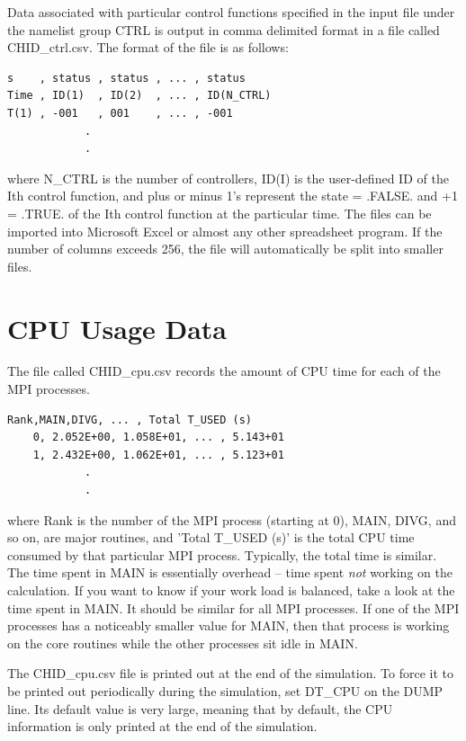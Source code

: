 \documentclass[11pt]{book}
\begin{document}
Data associated with particular control functions specified in the input file under the namelist group {\ct CTRL} is output in comma delimited format in a file called {\ct CHID\_ctrl.csv}. The format of the file is as follows:
\begin{lstlisting}
s    , status , status , ... , status
Time , ID(1)  , ID(2)  , ... , ID(N_CTRL)
T(1) , -001   , 001    , ... , -001
            .
            .
\end{lstlisting}
where {\ct N\_CTRL} is the number of controllers, {\ct ID(I)} is the user-defined ID of the {\ct I}th control function, and plus or minus 1's represent the state { = .FALSE. and +1 = .TRUE.} of the {\ct I}th control function at the particular time. The files can be imported into Microsoft Excel or almost any other spreadsheet program. If the number of columns exceeds 256, the file will automatically be split into smaller files.

\section{CPU Usage Data}
\label{out:CPU}

The file called {\ct CHID\_cpu.csv} records the amount of CPU time for each of the MPI processes.
\begin{lstlisting}
Rank,MAIN,DIVG, ... , Total T_USED (s)
    0, 2.052E+00, 1.058E+01, ... , 5.143+01
    1, 2.432E+00, 1.062E+01, ... , 5.123+01
            .
            .
\end{lstlisting}
where {\ct Rank} is the number of the MPI process (starting at 0), {\ct MAIN}, {\ct DIVG}, and so on, are major routines, and {\ct 'Total T\_USED (s)'} is the total CPU time consumed by that particular MPI process. Typically, the total time is similar. The time spent in {\ct MAIN} is essentially overhead -- time spent {\em not} working on the calculation. If you want to know if your work load is balanced, take a look at the time spent in {\ct MAIN}. It should be similar for all MPI processes. If one of the MPI processes has a noticeably smaller value for {\ct MAIN}, then that process is working on the core routines while the other processes sit idle in {\ct MAIN}.

The {\ct CHID\_cpu.csv} file is printed out at the end of the simulation. To force it to be printed out periodically during the simulation, set {\ct DT\_CPU} on the {\ct DUMP} line. Its default value is very large, meaning that by default, the CPU information is only printed at the end of the simulation.
\end{document}
